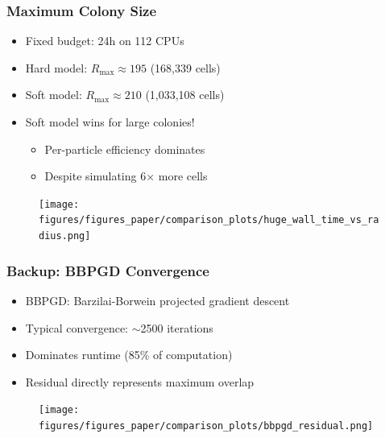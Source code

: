\documentclass[
	10pt,
	t
]{beamer}
\begin{document}
\begin{frame}
    \frametitle{Maximum Colony Size}

    \begin{itemize}
        \item Fixed budget: 24h on 112 CPUs
        \item Hard model: $R_{\text{max}} \approx 195$ (168,339 cells)
        \item Soft model: $R_{\text{max}} \approx 210$ (1,033,108 cells)
        \item Soft model wins for large colonies!
              \begin{itemize}
                  \item Per-particle efficiency dominates
                  \item Despite simulating 6$\times$ more cells
              \end{itemize}
    \end{itemize}

    \vspace{0.2cm}

    \begin{figure}
        \centering
        \texttt{[image: figures/figures\_paper/comparison\_plots/huge\_wall\_time\_vs\_radius.png]}
    \end{figure}

\end{frame}

\begin{frame}
    \frametitle{Backup: BBPGD Convergence}

    \begin{itemize}
        \item BBPGD: Barzilai-Borwein projected gradient descent
        \item Typical convergence: $\sim$2500 iterations
        \item Dominates runtime (85\% of computation)
        \item Residual directly represents maximum overlap
    \end{itemize}

    \vspace{0.2cm}

    \begin{figure}
        \centering
        \texttt{[image: figures/figures\_paper/comparison\_plots/bbpgd\_residual.png]}
    \end{figure}

\end{frame}
\end{document}

